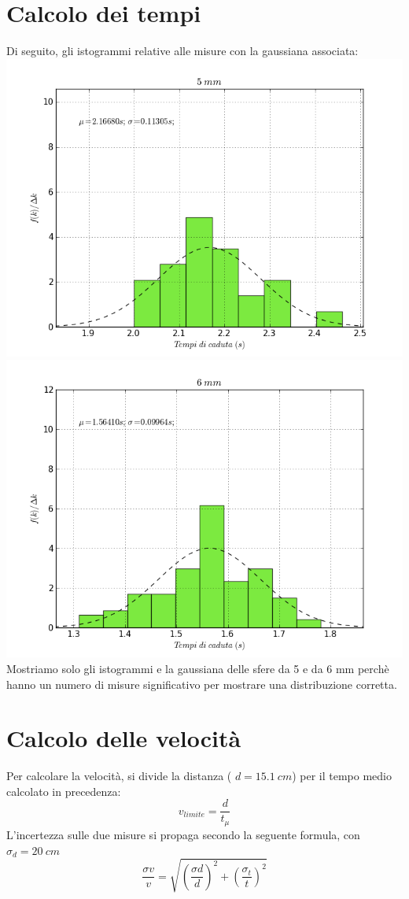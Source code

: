 \section{Calcolo dei tempi}
Di seguito, gli istogrammi relative alle misure con la gaussiana associata:
\\
\includegraphics[scale=0.4]{"../grafici/5mm"}
\includegraphics[scale=0.4]{"../grafici/6mm"}
Mostriamo solo gli istogrammi e la gaussiana delle sfere da 5 e da 6 mm perchè hanno un numero di misure significativo per mostrare una distribuzione corretta.

\section{Calcolo delle velocità}
Per calcolare la velocità, si divide la distanza ( $ d= 15.1\ cm$) per il tempo medio calcolato in precedenza:
$$ v_{limite} = \frac{d}{t_{\mu}} $$
L'incertezza sulle due misure si propaga secondo la seguente formula, con $\sigma_d=20\ cm$
\begin{equation}
 \frac{\sigma v}{v} = \sqrt{\left(\frac{\sigma d}{d}\right)^2 + \left(\frac{\sigma_t}{t}\right)^2} 
\end{equation}

